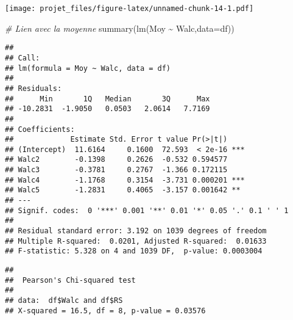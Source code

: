 \documentclass[
]{article}
\newenvironment{Shaded}{\begin{snugshade}}{\end{snugshade}}
\newcommand{\AttributeTok}[1]{\textcolor[rgb]{0.77,0.63,0.00}{#1}}
\newcommand{\CommentTok}[1]{\textcolor[rgb]{0.56,0.35,0.01}{\textit{#1}}}
\newcommand{\FunctionTok}[1]{\textcolor[rgb]{0.00,0.00,0.00}{#1}}
\newcommand{\NormalTok}[1]{#1}
\newcommand{\OtherTok}[1]{\textcolor[rgb]{0.56,0.35,0.01}{#1}}
\newcommand{\SpecialCharTok}[1]{\textcolor[rgb]{0.00,0.00,0.00}{#1}}
\begin{document}
\texttt{[image: projet\_files/figure-latex/unnamed-chunk-14-1.pdf]}

\begin{Shaded}
\begin{Highlighting}[]
\CommentTok{\# Lien avec la moyenne}
\FunctionTok{summary}\NormalTok{(}\FunctionTok{lm}\NormalTok{(Moy }\SpecialCharTok{\textasciitilde{}}\NormalTok{ Walc,}\AttributeTok{data=}\NormalTok{df))}
\end{Highlighting}
\end{Shaded}

\begin{verbatim}
## 
## Call:
## lm(formula = Moy ~ Walc, data = df)
## 
## Residuals:
##      Min       1Q   Median       3Q      Max 
## -10.2831  -1.9050   0.0503   2.0614   7.7169 
## 
## Coefficients:
##             Estimate Std. Error t value Pr(>|t|)    
## (Intercept)  11.6164     0.1600  72.593  < 2e-16 ***
## Walc2        -0.1398     0.2626  -0.532 0.594577    
## Walc3        -0.3781     0.2767  -1.366 0.172115    
## Walc4        -1.1768     0.3154  -3.731 0.000201 ***
## Walc5        -1.2831     0.4065  -3.157 0.001642 ** 
## ---
## Signif. codes:  0 '***' 0.001 '**' 0.01 '*' 0.05 '.' 0.1 ' ' 1
## 
## Residual standard error: 3.192 on 1039 degrees of freedom
## Multiple R-squared:  0.0201, Adjusted R-squared:  0.01633 
## F-statistic: 5.328 on 4 and 1039 DF,  p-value: 0.0003004
\end{verbatim}

\begin{Shaded}
\end{Shaded}

\begin{verbatim}
## 
##  Pearson's Chi-squared test
## 
## data:  df$Walc and df$RS
## X-squared = 16.5, df = 8, p-value = 0.03576
\end{verbatim}

\begin{Shaded}
\end{Shaded}
\end{document}
